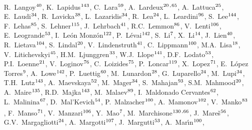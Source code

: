 \begin{flushleft}
R.~Langoy$^\textrm{\scriptsize 40}$,
K.~Lapidus$^\textrm{\scriptsize 143}$,
C.~Lara$^\textrm{\scriptsize 59}$,
A.~Lardeux$^\textrm{\scriptsize 20}$\textsuperscript{,}$^\textrm{\scriptsize 65}$,
A.~Lattuca$^\textrm{\scriptsize 25}$,
E.~Laudi$^\textrm{\scriptsize 34}$,
R.~Lavicka$^\textrm{\scriptsize 38}$,
L.~Lazaridis$^\textrm{\scriptsize 34}$,
R.~Lea$^\textrm{\scriptsize 24}$,
L.~Leardini$^\textrm{\scriptsize 96}$,
S.~Lee$^\textrm{\scriptsize 144}$,
F.~Lehas$^\textrm{\scriptsize 85}$,
S.~Lehner$^\textrm{\scriptsize 115}$,
J.~Lehrbach$^\textrm{\scriptsize 41}$,
R.C.~Lemmon$^\textrm{\scriptsize 86}$,
V.~Lenti$^\textrm{\scriptsize 106}$,
E.~Leogrande$^\textrm{\scriptsize 53}$,
I.~Le\'{o}n Monz\'{o}n$^\textrm{\scriptsize 122}$,
P.~L\'{e}vai$^\textrm{\scriptsize 142}$,
S.~Li$^\textrm{\scriptsize 7}$,
X.~Li$^\textrm{\scriptsize 14}$,
J.~Lien$^\textrm{\scriptsize 40}$,
R.~Lietava$^\textrm{\scriptsize 104}$,
S.~Lindal$^\textrm{\scriptsize 20}$,
V.~Lindenstruth$^\textrm{\scriptsize 41}$,
C.~Lippmann$^\textrm{\scriptsize 100}$,
M.A.~Lisa$^\textrm{\scriptsize 18}$,
V.~Litichevskyi$^\textrm{\scriptsize 45}$,
H.M.~Ljunggren$^\textrm{\scriptsize 33}$,
W.J.~Llope$^\textrm{\scriptsize 141}$,
D.F.~Lodato$^\textrm{\scriptsize 53}$,
P.I.~Loenne$^\textrm{\scriptsize 21}$,
V.~Loginov$^\textrm{\scriptsize 76}$,
C.~Loizides$^\textrm{\scriptsize 75}$,
P.~Loncar$^\textrm{\scriptsize 119}$,
X.~Lopez$^\textrm{\scriptsize 71}$,
E.~L\'{o}pez Torres$^\textrm{\scriptsize 9}$,
A.~Lowe$^\textrm{\scriptsize 142}$,
P.~Luettig$^\textrm{\scriptsize 60}$,
M.~Lunardon$^\textrm{\scriptsize 28}$,
G.~Luparello$^\textrm{\scriptsize 24}$,
M.~Lupi$^\textrm{\scriptsize 34}$,
T.H.~Lutz$^\textrm{\scriptsize 143}$,
A.~Maevskaya$^\textrm{\scriptsize 52}$,
M.~Mager$^\textrm{\scriptsize 34}$,
S.~Mahajan$^\textrm{\scriptsize 93}$,
S.M.~Mahmood$^\textrm{\scriptsize 20}$,
A.~Maire$^\textrm{\scriptsize 135}$,
R.D.~Majka$^\textrm{\scriptsize 143}$,
M.~Malaev$^\textrm{\scriptsize 89}$,
I.~Maldonado Cervantes$^\textrm{\scriptsize 62}$,
L.~Malinina$^\textrm{\scriptsize 67}$,
D.~Mal'Kevich$^\textrm{\scriptsize 54}$,
P.~Malzacher$^\textrm{\scriptsize 100}$,
A.~Mamonov$^\textrm{\scriptsize 102}$,
V.~Manko$^\textrm{\scriptsize 83}$,
F.~Manso$^\textrm{\scriptsize 71}$,
V.~Manzari$^\textrm{\scriptsize 106}$,
Y.~Mao$^\textrm{\scriptsize 7}$,
M.~Marchisone$^\textrm{\scriptsize 130}$\textsuperscript{,}$^\textrm{\scriptsize 66}$,
J.~Mare\v{s}$^\textrm{\scriptsize 56}$,
G.V.~Margagliotti$^\textrm{\scriptsize 24}$,
A.~Margotti$^\textrm{\scriptsize 107}$,
J.~Margutti$^\textrm{\scriptsize 53}$,
A.~Mar\'{\i}n$^\textrm{\scriptsize 100}$,

\end{flushleft}
